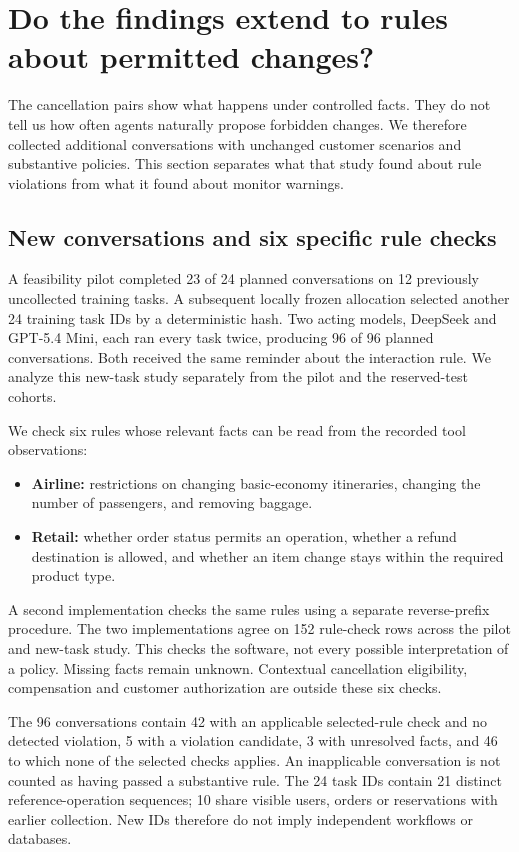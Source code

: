 \section{Do the findings extend to rules about permitted changes?}
\label{sec:substantive_extension}
The cancellation pairs show what happens under controlled facts. They do not tell us how often agents naturally propose forbidden changes. We therefore collected additional conversations with unchanged customer scenarios and substantive policies. This section separates what that study found about rule violations from what it found about monitor warnings.

\subsection{New conversations and six specific rule checks}
A feasibility pilot completed 23 of 24 planned conversations on 12 previously uncollected training tasks. A subsequent locally frozen allocation selected another 24 training task IDs by a deterministic hash. Two acting models, DeepSeek and GPT-5.4 Mini, each ran every task twice, producing 96 of 96 planned conversations. Both received the same reminder about the interaction rule. We analyze this new-task study separately from the pilot and the reserved-test cohorts.

We check six rules whose relevant facts can be read from the recorded tool observations:
\begin{itemize}
\item \textbf{Airline:} restrictions on changing basic-economy itineraries, changing the number of passengers, and removing baggage.
\item \textbf{Retail:} whether order status permits an operation, whether a refund destination is allowed, and whether an item change stays within the required product type.
\end{itemize}
A second implementation checks the same rules using a separate reverse-prefix procedure. The two implementations agree on 152 rule-check rows across the pilot and new-task study. This checks the software, not every possible interpretation of a policy. Missing facts remain unknown. Contextual cancellation eligibility, compensation and customer authorization are outside these six checks.

The 96 conversations contain 42 with an applicable selected-rule check and no detected violation, 5 with a violation candidate, 3 with unresolved facts, and 46 to which none of the selected checks applies. An inapplicable conversation is not counted as having passed a substantive rule. The 24 task IDs contain 21 distinct reference-operation sequences; 10 share visible users, orders or reservations with earlier collection. New IDs therefore do not imply independent workflows or databases.

